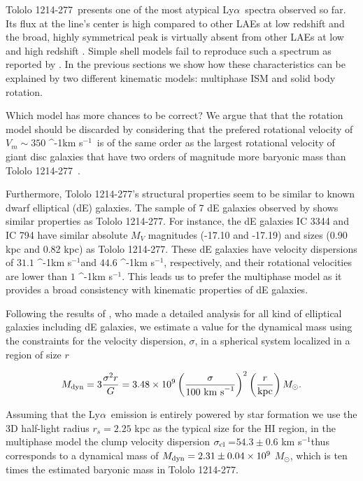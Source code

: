 \documentclass[a4paper,fleqn,usenatbib]{mnras}
\newcommand{\tol}{Tololo 1214-277}
\newcommand{\lya}{\ifmmode{{\rm Ly}\alpha}\else Ly$\alpha$\ \fi}
\newcommand{\kms}{\ifmmode\mathrm{km\ s}^{-1}\else km s$^{-1}$\fi}
\newcommand{\sigmaclump}{$54.3\pm 0.6$ km s$^{-1}$}
\begin{document}
\tol\ presents one of the most atypical \lya spectra observed so far.
Its flux at the line's center is high compared to other LAEs at low
redshift and the broad, highly symmetrical peak is virtually absent from other
LAEs at low and high redshift
\citep{2012ApJ...751...29Y,LARS,Erb14,Trainor16}. 
Simple shell models
fail to reproduce such a spectrum as reported by \cite{2015A&A...578A...7V}.  
In the previous sections we show how these characteristics can be
explained by two different kinematic models: multiphase ISM and solid
body rotation.

Which model has more
chances to be correct?  
We argue that that the rotation model should be discarded by
considering that the prefered rotational velocity of $V_{m}\sim350$
\kms\ is of the same order as the largest rotational velocity of giant
disc galaxies that have two orders of magnitude more baryonic mass
than \tol\ \citep{2015MNRAS.448.1767C}.  

Furthermore, \tol's structural properties seem to be similar to known dwarf
elliptical (dE) galaxies. 
The sample of 7 dE galaxies observed by
\cite{2003AJ....126.1794G} shows similar properties as \tol. 
For instance, the dE galaxies IC 3344 and IC 794 have similar absolute $M_V$
magnitudes (-17.10 and -17.19) and sizes (0.90 kpc and 0.82 kpc) as
\tol. 
These dE galaxies have velocity dispersions of $31.1$ \kms and
$44.6$ \kms, respectively,  and their rotational velocities are lower
than $1$ \kms.  
This leads us to prefer the multiphase model as it provides 
a broad consistency with kinematic properties of dE galaxies.

 
Following the results of \cite{2011ApJ...726..108T}, who made a
detailed analysis for all kind of elliptical galaxies including dE galaxies, we
estimate a value for the dynamical mass using the constraints for
the velocity dispersion, $\sigma$,  in a spherical system localized in a
region of size $r$   


\begin{equation}
M_{\rm dyn} = 3 \frac{\sigma ^{2}r}{G} = 3.48\times10^{9}
\left(\frac{\sigma}{100\ \mathrm{km\ s}^{-1}}\right)^2\left(\frac{r}{\mathrm{kpc}}\right)
M_{\odot}. 
\end{equation}

Assuming that the \lya emission is entirely powered by star formation 
we use the 3D half-light radius $r_s=2.25$ kpc as the typical size
for the HI region, in the multiphase model the clump velocity dispersion
$\sigma_{\rm{cl}}=$\sigmaclump thus corresponds to a dynamical mass of
$M_{\rm dyn}=2.31\pm0.04 \times 10^{9}$ $M_{\odot}$, which is ten
times the estimated baryonic mass in \tol.
\end{document}
